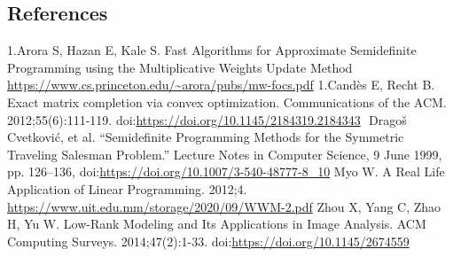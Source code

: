 \documentclass{article}
\begin{document}
\newpage
\subsection{References}
\begin{thebibliography}{12}
 1.Arora S, Hazan E, Kale S. Fast Algorithms for Approximate Semidefinite Programming using the Multiplicative Weights Update Method \url{https://www.cs.princeton.edu/~arora/pubs/mw-focs.pdf}
 1.Candès E, Recht B. Exact matrix completion via convex optimization. Communications of the ACM. 2012;55(6):111-119. doi:\url{https://doi.org/10.1145/2184319.2184343}
‌ Dragoš Cvetković, et al. “Semidefinite Programming Methods for the Symmetric Traveling Salesman Problem.” Lecture Notes in Computer Science, 9 June 1999, pp. 126–136, doi:\url{https://doi.org/10.1007/3-540-48777-8_10} 
 Myo W. A Real Life Application of Linear Programming. 2012;4. \url{https://www.uit.edu.mm/storage/2020/09/WWM-2.pdf}
 Zhou X, Yang C, Zhao H, Yu W. Low-Rank Modeling and Its Applications in Image Analysis. ACM Computing Surveys. 2014;47(2):1-33. doi:\url{https://doi.org/10.1145/2674559}
\end{thebibliography}
\end{document}
